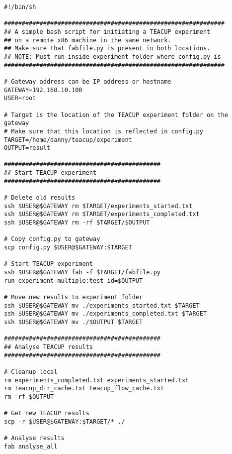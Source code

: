 \begin{code}
\begin{verbatim}
#!/bin/sh

##############################################################
## A simple bash script for initiating a TEACUP experiment
## on a remote x86 machine in the same network.
## Make sure that fabfile.py is present in both locations.
## NOTE: Must run inside experiment folder where config.py is
##############################################################

# Gateway address can be IP address or hostname
GATEWAY=192.168.10.100
USER=root

# Target is the location of the TEACUP experiment folder on the gateway
# Make sure that this location is reflected in config.py
TARGET=/home/danny/teacup/experiment
OUTPUT=result

############################################
## Start TEACUP experiment
############################################

# Delete old results
ssh $USER@$GATEWAY rm $TARGET/experiments_started.txt
ssh $USER@$GATEWAY rm $TARGET/experiments_completed.txt
ssh $USER@$GATEWAY rm -rf $TARGET/$OUTPUT

# Copy config.py to gateway
scp config.py $USER@$GATEWAY:$TARGET

# Start TEACUP experiment
ssh $USER@$GATEWAY fab -f $TARGET/fabfile.py run_experiment_multiple:test_id=$OUTPUT

# Move new results to experiment folder
ssh $USER@$GATEWAY mv ./experiments_started.txt $TARGET
ssh $USER@$GATEWAY mv ./experiments_completed.txt $TARGET
ssh $USER@$GATEWAY mv ./$OUTPUT $TARGET

############################################
## Analyse TEACUP results
############################################

# Cleanup local
rm experiments_completed.txt experiments_started.txt
rm teacup_dir_cache.txt teacup_flow_cache.txt
rm -rf $OUTPUT

# Get new TEACUP results
scp -r $USER@$GATEWAY:$TARGET/* ./

# Analyse results
fab analyse_all
\end{verbatim}
\label{code:teacup-init}
\end{code}

















